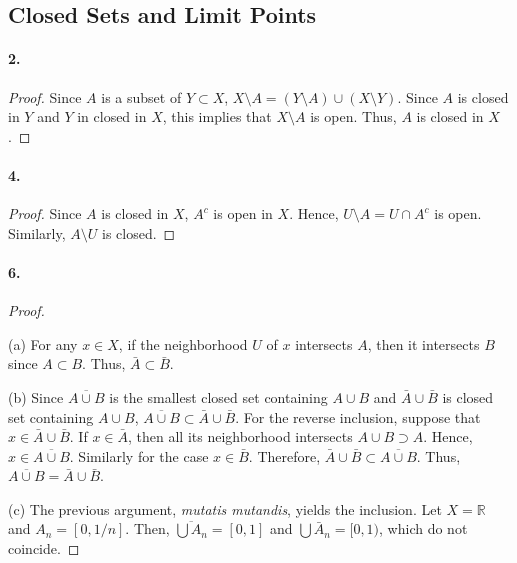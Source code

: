 \subsection{Closed Sets and Limit Points}
  \paragraph{2.}
  \begin{proof}
    Since $A$ is a subset of $Y\subset X$, $X\setminus A=(Y\setminus A)\cup
    (X\setminus Y)$. Since $A$ is closed in $Y$ and $Y$ in closed in $X$, this
    implies that $X\setminus A$ is open. Thus, $A$ is closed in $X$.
  \end{proof}
  
  \paragraph{4.}
  \begin{proof}
    Since $A$ is closed in $X$, $A^c$ is open in $X$. Hence, $U\setminus A=
    U\cap A^c$ is open. Similarly, $A\setminus U$ is closed.
  \end{proof}
  
  \paragraph{6.}
  \begin{proof}
    $\,$\par
    (a) For any $x\in X$, if the neighborhood $U$ of $x$ intersects $A$, then
    it intersects $B$ since $A\subset B$. Thus, $\bar{A}\subset\bar{B}$.\par
    (b) Since $\overline{A\cup B}$ is the smallest closed set containing $A
    \cup B$ and $\bar{A}\cup\bar{B}$ is closed set containing $A\cup B$, 
    $\overline{A\cup B}\subset\bar{A}\cup\bar{B}$. For the reverse inclusion,
    suppose that $x\in\bar{A}\cup\bar{B}$. If $x\in\bar{A}$, then all its 
    neighborhood intersects $A\cup B\supset A$. Hence, $x\in\overline{A\cup 
    B}$. Similarly for the case $x\in\bar{B}$. Therefore, $\bar{A}\cup\bar{B}
    \subset\overline{A\cup B}$. Thus, $\overline{A\cup B}=\bar{A}\cup\bar{B}$.
    \par
    (c) The previous argument, \textit{mutatis mutandis}, yields the inclusion.
    Let $X=\mathbb{R}$ and $A_n=[0,1/n]$. Then, $\overline{\bigcup A_n}=[0,1]$
    and $\bigcup\bar{A}_n=[0,1)$, which do not coincide.
  \end{proof}
  

